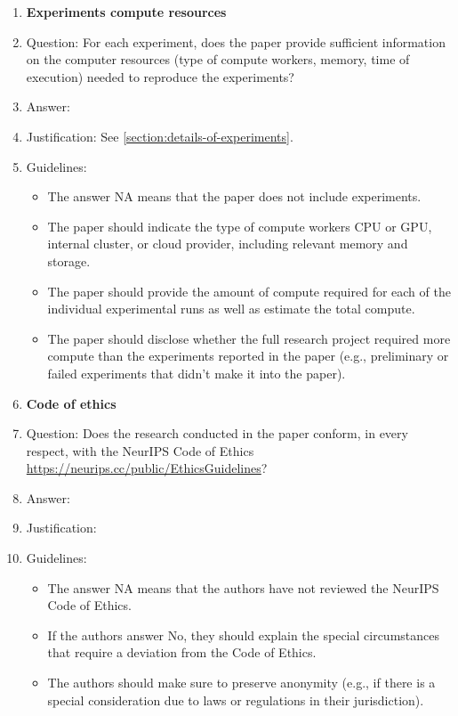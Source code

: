 \documentclass{article}
\theoremstyle{plain}
\theoremstyle{remark}
\begin{document}
\begin{enumerate}
\item {\bf Experiments compute resources}
    \item[] Question: For each experiment, does the paper provide sufficient information on the computer resources (type of compute workers, memory, time of execution) needed to reproduce the experiments?
    \item[] Answer: \answerYes{} %
    \item[] Justification: See \cref{section:details-of-experiments}.
    \item[] Guidelines:
    \begin{itemize}
        \item The answer NA means that the paper does not include experiments.
        \item The paper should indicate the type of compute workers CPU or GPU, internal cluster, or cloud provider, including relevant memory and storage.
        \item The paper should provide the amount of compute required for each of the individual experimental runs as well as estimate the total compute. 
        \item The paper should disclose whether the full research project required more compute than the experiments reported in the paper (e.g., preliminary or failed experiments that didn't make it into the paper). 
    \end{itemize}
    
\item {\bf Code of ethics}
    \item[] Question: Does the research conducted in the paper conform, in every respect, with the NeurIPS Code of Ethics \url{https://neurips.cc/public/EthicsGuidelines}?
    \item[] Answer: \answerYes{} %
    \item[] Justification: 
    \item[] Guidelines:
    \begin{itemize}
        \item The answer NA means that the authors have not reviewed the NeurIPS Code of Ethics.
        \item If the authors answer No, they should explain the special circumstances that require a deviation from the Code of Ethics.
        \item The authors should make sure to preserve anonymity (e.g., if there is a special consideration due to laws or regulations in their jurisdiction).
    \end{itemize}



\end{enumerate}
\end{document}
